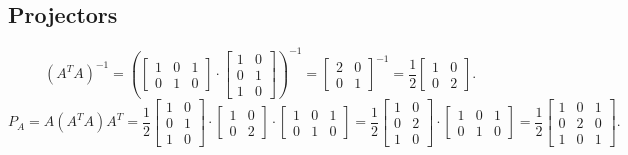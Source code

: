 \documentclass[14pt, notitlepage]{article}
\begin{document}
\subsection*{Projectors}
\[
    \left(A^T A\right)^{-1} = \left( \begin{bmatrix}
        1 & 0 & 1 \\
        0 & 1 & 0
    \end{bmatrix} \cdot \begin{bmatrix}
        1 & 0 \\
        0 & 1 \\
        1 & 0
    \end{bmatrix} \right)^{-1} = \begin{bmatrix}
        2 & 0 \\
        0 & 1
    \end{bmatrix}^{-1} = \frac{1}{2} \begin{bmatrix}
        1 & 0 \\
        0 & 2
    \end{bmatrix}.
\]
\[
    P_{A} = A\left( A^T A \right) A^T = \frac{1}{2} \begin{bmatrix}
        1 & 0 \\
        0 & 1 \\
        1 & 0
    \end{bmatrix} \cdot \begin{bmatrix}
        1 & 0 \\
        0 & 2
    \end{bmatrix} \cdot \begin{bmatrix}
        1 & 0 & 1 \\
        0 & 1 & 0
    \end{bmatrix} = \frac{1}{2} \begin{bmatrix}
        1 & 0 \\
        0 & 2 \\
        1 & 0
    \end{bmatrix} \cdot \begin{bmatrix}
        1 & 0 & 1 \\
        0 & 1 & 0
    \end{bmatrix} = \frac{1}{2} \begin{bmatrix}
        1 & 0 & 1 \\
        0 & 2 & 0 \\
        1 & 0 & 1
    \end{bmatrix}.
\]
\end{document}
